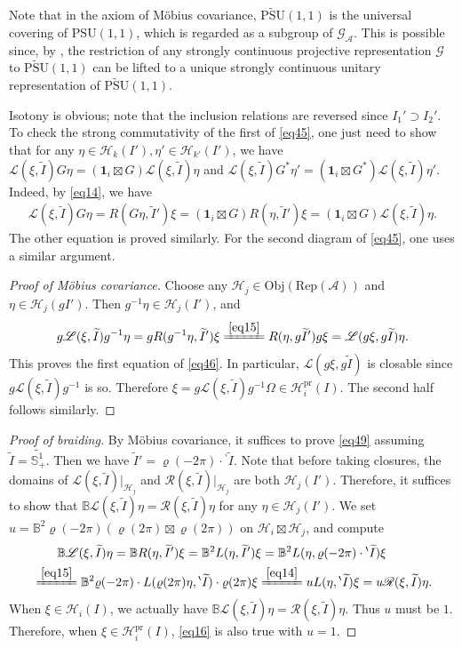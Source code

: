 \documentclass[11pt,b5paper,notitlepage]{article}
\theoremstyle{definition}
\theoremstyle{plain}
\newcommand{\mc}{\mathcal}
\newcommand{\wtd}{\widetilde}
\newcommand{\id}{\mathbf{1}}
\newcommand{\PSU}{\mathrm{PSU}(1,1)}
\newcommand{\UPSU}{\widetilde{\mathrm{PSU}}(1,1)}
\newcommand{\GA}{\mathscr G_{\mathcal A}}
\newcommand{\scr}{\mathscr}
\newcommand{\RepA}{\mathrm{Rep}(\mc A)}
\newcommand{\mbb}{\mathbb}
\newcommand{\Obj}{\mathrm{Obj}}
\newcommand{\bpr}{{}^\backprime}
\newcommand{\pr}{\mathrm{pr}}
\numberwithin{equation}{subsection}
\begin{document}
Note that in the axiom of M\"obius covariance, $\UPSU$ is the universal covering of $\PSU$, which is regarded as a subgroup of $\GA$. This is possible since, by \cite{Bar54}, the restriction of any strongly continuous projective representation $\scr G$ to $\UPSU$ can be lifted to a unique strongly continuous unitary representation of $\UPSU$. 

Isotony is obvious; note that the inclusion relations are reversed since $I_1'\supset I_2'$. To check the strong commutativity of the first of \eqref{eq45}, one just need to show that for any $\eta\in\mc H_k(I'),\eta'\in\mc H_{k'}(I')$, we have $\scr L(\xi,\wtd I)G\eta=(\id_i\boxtimes G)\scr L(\xi,\wtd I)\eta$ and  $\scr L(\xi,\wtd I)G^*\eta'=(\id_i\boxtimes G^*)\scr L(\xi,\wtd I)\eta'$. Indeed, by \eqref{eq14}, we have
\begin{align*}
\scr L(\xi,\wtd I)G\eta=R(G\eta,\wtd I')\xi=(\id_i\boxtimes G)R(\eta,\wtd I')\xi=(\id_i\boxtimes G)\scr L(\xi,\wtd I)\eta.
\end{align*}
The other equation is proved similarly. For the second diagram of \eqref{eq45}, one uses a similar argument. 

\begin{proof}[Proof of M\"obius covariance]
Choose any $\mc H_j\in\Obj(\RepA)$ and $\eta\in\mc H_j(gI')$. Then $g^{-1}\eta\in\mc H_j(I')$, and 
	\begin{align*}
	g\scr L(\xi,\wtd I)g^{-1}\eta=gR(g^{-1}\eta,\wtd I')\xi \xlongequal{\eqref{eq15}} R(\eta,g\wtd I')g\xi=\scr L(g\xi,g\wtd I)\eta.
	\end{align*}
This proves the first equation of \eqref{eq46}. In particular, $\scr L(g\xi,g\wtd I)$ is closable since $g\scr L(\xi,\wtd I)g^{-1}$ is so. Therefore $\xi=g\scr L(\xi,\wtd I)g^{-1}\Omega\in\mc H_i^\pr(I)$. The second half follows similarly.	
\end{proof}	


\begin{proof}[Proof of braiding]
By M\"obius covariance, it suffices to prove \eqref{eq49} assuming $\wtd I=\wtd{\mbb S^1_+}$. Then we have $\wtd I'=\varrho(-2\pi)\cdot\bpr\wtd I$. Note that before taking closures, the domains of $\scr L(\xi,\wtd I)|_{\mc H_j}$ and $\scr R(\xi,\wtd I)|_{\mc H_j}$ are both $\mc H_j(I')$. Therefore, it suffices to show that $\mbb B \scr L(\xi,\wtd I)\eta=\scr R(\xi,\wtd I)\eta$ for any $\eta\in \mc H_j(I')$. We set $u=\mbb B^2\varrho(-2\pi)(\varrho(2\pi)\boxtimes\varrho(2\pi))$ on $\mc H_i\boxtimes\mc H_j$, and compute
\begin{align}
&~~~~~~ \mbb B \scr L(\xi,\wtd I)\eta=\mbb B R(\eta,\wtd I')\xi=\mbb B^2L(\eta,\wtd I')\xi=\mbb B^2 L(\eta,\varrho(-2\pi)\cdot\bpr\wtd I)\xi\nonumber\\ &\xlongequal{\eqref{eq15}} \mbb B^2\varrho(-2\pi)\cdot L(\varrho(2\pi)\eta,\bpr\wtd I)\cdot \varrho(2\pi)\xi\xlongequal{\eqref{eq14}}uL(\eta,\bpr\wtd I)\xi =u\scr R(\xi,\wtd I)\eta.\label{eq16}
\end{align}
When $\xi\in\mc H_i(I)$, we actually have $\mbb B\scr L(\xi,\wtd I)\eta=\scr R(\xi,\wtd I)\eta$. Thus $u$ must be $1$. Therefore, when $\xi\in\mc H_i^\pr(I)$, \eqref{eq16} is also true with $u=1$.
\end{proof}	
\end{document}
